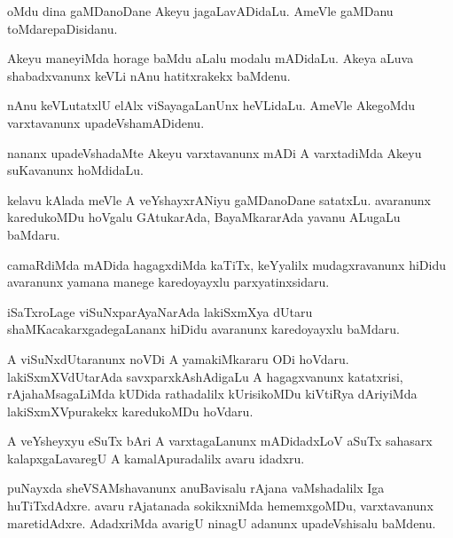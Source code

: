 \begin{mng}
oMdu dina gaMDanoDane Akeyu jagaLavADidaLu. AmeVle gaMDanu toMdarepaDisidanu.
\end{mng}

\begin{mng}
Akeyu maneyiMda horage baMdu aLalu modalu mADidaLu. Akeya aLuva shabadxvanunx keVLi nAnu hatitxrakekx baMdenu.
\end{mng}

\begin{mng}
nAnu keVLutatxlU elAlx viSayagaLanUnx heVLidaLu. AmeVle AkegoMdu varxtavanunx upadeVshamADidenu.
\end{mng}

\begin{mng}
nananx upadeVshadaMte Akeyu varxtavanunx mADi A varxtadiMda Akeyu suKavanunx hoMdidaLu.
\end{mng}

\begin{mng}
kelavu kAlada meVle A veYshayxrANiyu gaMDanoDane satatxLu. avaranunx karedukoMDu hoVgalu GAtukarAda, BayaMkararAda yavanu ALugaLu baMdaru.
\end{mng}

\begin{mng}
camaRdiMda mADida hagagxdiMda kaTiTx, keYyalilx mudagxravanunx hiDidu avaranunx yamana manege karedoyayxlu parxyatinxsidaru.
\end{mng}

\begin{mng}
iSaTxroLage viSuNxparAyaNarAda lakiSxmXya dUtaru shaMKacakarxgadegaLananx hiDidu avaranunx karedoyayxlu baMdaru.
\end{mng}

\begin{mng}
A viSuNxdUtaranunx noVDi A yamakiMkararu ODi hoVdaru. lakiSxmXVdUtarAda savxparxkAshAdigaLu A hagagxvanunx katatxrisi, rAja{ha}MsagaLiMda kUDida rathadalilx kUrisikoMDu kiVtiRya dAriyiMda lakiSxmXVpurakekx karedukoMDu hoVdaru.
\end{mng}

\begin{mng}
A veYsheyxyu eSuTx bAri A varxtagaLanunx mADidadxLoV aSuTx sahasarx kalapxgaLavaregU A kamalApuradalilx avaru idadxru.
\end{mng}

\begin{mng}
puNayxda sheVSAMshavanunx anuBavisalu rAjana vaMshadalilx Iga huTiTxdAdxre. avaru rAjatanada sokikxniMda hememxgoMDu, varxtavanunx maretidAdxre. AdadxriMda avarigU ninagU adanunx upadeVshisalu baMdenu.
\end{mng}

